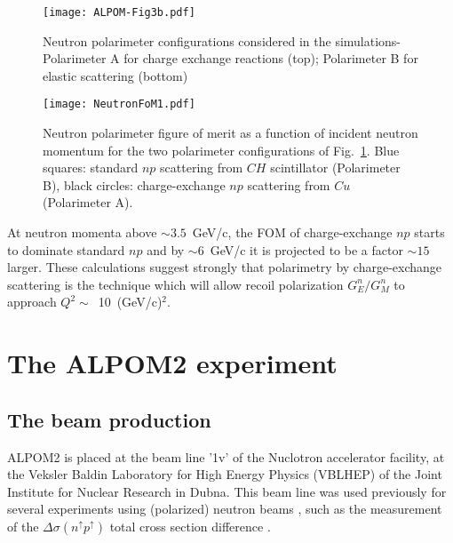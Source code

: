 \documentclass[epj]{svjour}
\begin{document}
\begin{figure}
\begin{center}
\texttt{[image: ALPOM-Fig3b.pdf]}
\caption{Neutron polarimeter configurations considered in the simulations- Polarimeter A for charge exchange reactions (top); Polarimeter B for elastic scattering  (bottom) }
\label{fig:FoMPol}
\end{center}
\end{figure}


\begin{figure}
\texttt{[image: NeutronFoM1.pdf]}
\caption{Neutron polarimeter figure of merit as a function
of incident neutron momentum for the two polarimeter configurations of Fig.~\protect\ref{fig:FoMPol}.
Blue squares: standard $np$ scattering from $CH$ scintillator (Polarimeter B), black
circles: charge-exchange $np$ scattering from $Cu$ (Polarimeter A).}
\label{fig:FoM}
\end{figure}

At neutron momenta above $\sim3.5$~GeV/c, the FOM of charge-exchange
$np$ starts to dominate standard $np$ and by $\sim 6$~GeV/c it
is projected to be a factor $\sim 15$ larger. These calculations suggest strongly that polarimetry by charge-exchange scattering is the technique which will allow recoil polarization  $G^n_E/G^n_M$ to approach $Q^2 \sim$~10~(GeV/c)$^2$. 



\section{The ALPOM2 experiment}
\subsection{The beam production}

ALPOM2 is placed at the beam line '1v' of the Nuclotron  accelerator facility, at the Veksler Baldin Laboratory for High Energy Physics (VBLHEP) of the Joint Institute for Nuclear Research in Dubna. This beam line was used previously for several experiments using (polarized) neutron beams  \cite{Kirillov:1996zf}, such as the measurement of the $\Delta\sigma(n^\uparrow p^\uparrow)$ total cross section difference \cite{Sharov:2004pg}. 
\end{document}
